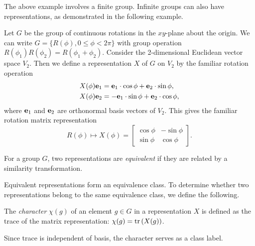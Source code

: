 The above example involves a finite group. Infinite groups can also have representations, as demonstrated in the following example.
\begin{example}
    Let $G$ be the group of continuous rotations in the $xy$-plane about the origin. We can write $G = \{R(\phi),0\leq\phi<2\pi\}$ with group operation $R(\phi_1)R(\phi_2) = R(\phi_1+\phi_2)$. Consider the 2-dimensional Euclidean vector space $V_2$. Then we define a representation $X$ of $G$ on $V_2$ by the familiar rotation operation
    \begin{align}
        X(\phi)\mathbf{e}_1 &= \mathbf{e}_1\cdot\cos\phi + \mathbf{e}_2\cdot\sin\phi, \\
        X(\phi)\mathbf{e}_2 &= -\mathbf{e}_1\cdot\sin\phi + \mathbf{e}_2\cdot\cos\phi,
    \end{align}
    where $\mathbf{e}_1$ and $\mathbf{e}_2$ are orthonormal basis vectors of $V_2$. This gives the familiar rotation matrix representation
    \begin{equation}
        R(\phi) \mapsto X(\phi) = \begin{bmatrix}
            \cos\phi & -\sin\phi\\
            \sin\phi & \cos\phi
        \end{bmatrix}.
    \end{equation}
\end{example}

\begin{definition}
    For a group $G$, two representations are \textit{equivalent} if they are related by a similarity transformation.
\end{definition}

Equivalent representations form an equivalence class. To determine whether two representations belong to the same equivalence class, we define the following.
\begin{definition}
    The \textit{character} $\chi(g)$ of an element $g\in G$ in a representation $X$ is defined as the trace of the matrix representation: $\chi(g) = \textrm{tr}\left(X(g)\right)$.
\end{definition}
Since trace is independent of basis, the character serves as a class label.

